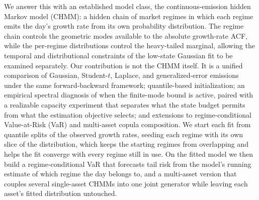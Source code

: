 We answer this with an established model class, the continuous-emission hidden Markov model (CHMM): a hidden chain of market regimes in which each regime emits the day's growth rate from its own probability distribution. The regime chain controls the geometric modes available to the absolute growth-rate ACF, while the per-regime distributions control the heavy-tailed marginal, allowing the temporal and distributional constraints of the low-state Gaussian fit to be examined separately. Our contribution is not the CHMM itself. It is a unified comparison of Gaussian, Student-$t$, Laplace, and generalized-error emissions under the same forward-backward framework; quantile-based initialization; an empirical spectral diagnosis of when the finite-mode bound is active, paired with a realizable capacity experiment that separates what the state budget permits from what the estimation objective selects; and extensions to regime-conditional Value-at-Risk (VaR) and multi-asset copula composition. We start each fit from quantile splits of the observed growth rates, seeding each regime with its own slice of the distribution, which keeps the starting regimes from overlapping and helps the fit converge with every regime still in use. On the fitted model we then build a regime-conditional VaR that forecasts tail risk from the model's running estimate of which regime the day belongs to, and a multi-asset version that couples several single-asset CHMMs into one joint generator while leaving each asset's fitted distribution untouched.

